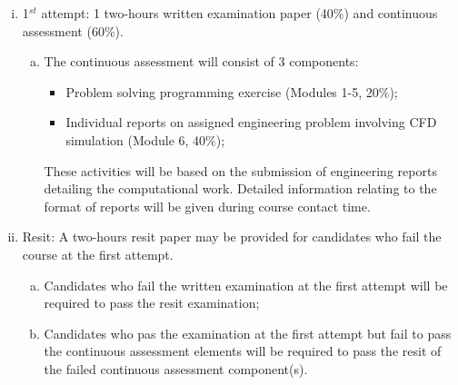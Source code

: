 \documentclass[12pts,a4paper,amsmath,amssymb,floatfix]{article}%
\begin{document}
\begin{enumerate}[(i)]
   \item 1$^{st}$ attempt: 1 two-hours written examination paper (40$\%$) and continuous assessment (60$\%$). 
   \begin{enumerate}[(a)]
      \item The continuous assessment will consist of 3 components:
      \begin{itemize}
         \item Problem solving programming exercise (Modules 1-5, 20$\%$);
         \item Individual reports on assigned engineering problem involving CFD simulation (Module 6, 40$\%$);
      \end{itemize}
These activities will be based on the submission of engineering reports detailing the computational work. Detailed information relating to the format of reports will be given during course contact time.
   \end{enumerate}

   \item Resit: A two-hours resit paper may be provided for candidates who fail the course at the first attempt. 
   \begin{enumerate}[(a)]
      \item Candidates who fail the written examination at the first attempt will be required to pass the resit examination;
      \item Candidates who pas the examination at the first attempt but fail to pass the continuous assessment elements will be required to pass the resit of the failed continuous assessment component(s).
   \end{enumerate}


\end{enumerate}
\end{document}
